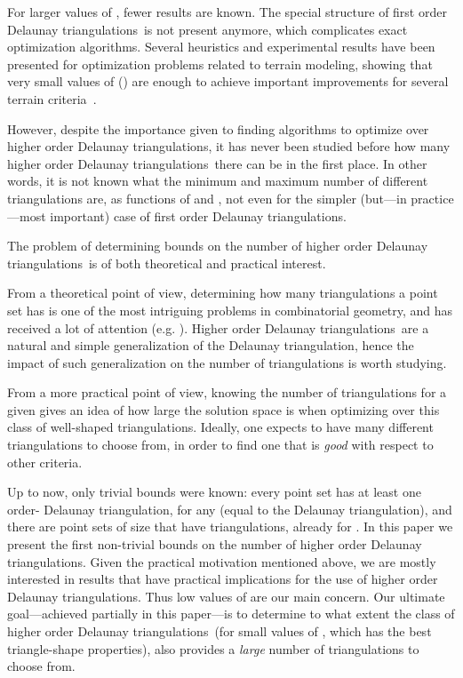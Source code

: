 \documentclass {journal}
\newcommand {\hodts}{higher order Delaunay triangulations}
\newcommand {\Hodts}{Higher order Delaunay triangulations}
\newcommand {\fodts}{first order Delaunay triangulations}
\begin{document}
For larger values of , fewer results are known.
The special structure of \fodts\ is not present anymore, which complicates exact optimization algorithms.
Several heuristics and experimental results have been presented for optimization problems related to terrain modeling,
showing that very small values of  () are enough to achieve important improvements for several terrain criteria~\cite{bg-drthodt-08,bg-sfthodt-08,kkl-grtho-07}.

However, despite the importance given to finding algorithms to
optimize over \hodts, it has never been studied before how many
\hodts\ there can be in the first place. In other words, it is not
known what the minimum and maximum number of different
triangulations are, as functions of  and , not even for the
simpler (but---in practice---most important) case of \fodts.

The problem of determining bounds on the number of \hodts\ is of
both theoretical and practical interest.

From a theoretical point of view, determining how many triangulations a point set has is one of the most intriguing problems in combinatorial geometry, and has received a lot of attention (e.g. \cite{ahhhk-npg-06,sw-rtpps-06,ss-bubnt-03}).
\Hodts\ are a natural and simple generalization of the Delaunay triangulation, hence the impact of such generalization on the number of triangulations is worth studying.

From a more practical point of view, knowing the number of
triangulations for a given  gives an idea of how large the
solution space is when optimizing over this class of well-shaped
triangulations. Ideally, one expects to have many different
triangulations to choose from, in order to find one that is
\emph{good} with respect to other criteria.

Up to now, only trivial bounds were known: every point set has at
least one order- Delaunay triangulation, for any  (equal to
the Delaunay triangulation), and there are point sets of size 
that have  triangulations, already for . In
this paper we present the first non-trivial bounds on the number
of \hodts. Given the practical motivation mentioned above, we are
mostly interested in results that have practical implications for
the use of \hodts. Thus low values of  are our main concern.
Our ultimate goal---achieved partially in this paper---is to
determine to what extent the class of \hodts\ (for small values of
, which has the best triangle-shape properties), also provides
a \emph{large} number of triangulations to choose from.
\end{document}
